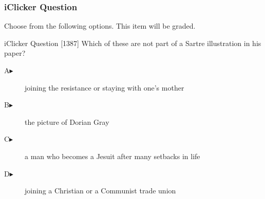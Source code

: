 \begin{frame}
  \frametitle{iClicker Question}
Choose from the following options. This item will be graded.
\begin{block}{iClicker Question}
[1387] Which of these are not part of a Sartre illustration in his paper?
\end{block}
\begin{description}
\item[A\hspace{.2in}$\blacktriangleright$] joining the resistance or staying with one's mother
\item[B\hspace{.2in}$\blacktriangleright$] the picture of Dorian Gray
\item[C\hspace{.2in}$\blacktriangleright$] a man who becomes a Jesuit after many setbacks in life
\item[D\hspace{.2in}$\blacktriangleright$] joining a Christian or a Communist trade union
\end{description}
\end{frame}
